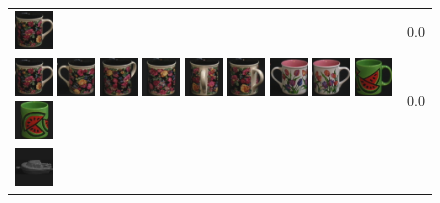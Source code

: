 \begin{figure}[!bp]
\begin{tabular}{m{11cm} | m{3cm} |}
\includegraphics[width=1cm]{coil/beeld-60.eps}
& {\scriptsize 0.0}
\\
\includegraphics[width=1cm]{coil/beeld-60.eps}
\includegraphics[width=1cm]{coil/beeld-61.eps}
\includegraphics[width=1cm]{coil/beeld-63.eps}
\includegraphics[width=1cm]{coil/beeld-62.eps}
\includegraphics[width=1cm]{coil/beeld-65.eps}
\includegraphics[width=1cm]{coil/beeld-64.eps}
\includegraphics[width=1cm]{coil/beeld-7.eps}
\includegraphics[width=1cm]{coil/beeld-6.eps}
\includegraphics[width=1cm]{coil/beeld-30.eps}
\includegraphics[width=1cm]{coil/beeld-32.eps}
& {\scriptsize 0.0}
\\
\includegraphics[width=1cm]{coil/beeld-24.eps}

\end{tabular}
\end{figure}
